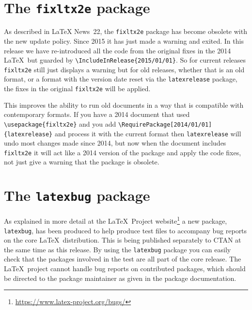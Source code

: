 \documentclass{ltnews}
\providecommand\pkg[1]{\texttt{#1}}
\begin{document}
\section{The \pkg{fixltx2e} package}
As described in \LaTeX{} News~22, the \pkg{fixltx2e} package has become
obsolete with the new update policy. Since 2015 it has just made a
warning and exited.  In this release we have re-introduced all
the code from the original fixes in the 2014 \LaTeX\ but guarded by
\verb|\IncludeInRelease{2015/01/01}|.
So for current releases \pkg{fixltx2e} still just displays a warning
but for old releases, whether that is an old format, or a format with
the version date reset via  the \pkg{latexrelease} package, the
fixes in the original \pkg{fixltx2e} will be applied.

This improves the ability to run old documents in a way that is compatible
with contemporary formats. If you have a 2014 document that used
\verb|\usepackage{fixltx2e}| and you add
\verb|\RequirePackage[2014/01/01]{latexrelease}| and process it with the
current format then \pkg{latexrelease} will undo most changes made
since 2014, but now when the document includes \pkg{fixltx2e} it
will act like a 2014 version of the package and apply the code fixes,
not just give a warning that the package is obsolete.

\section{The \pkg{latexbug} package}

As explained in more detail
at the \LaTeX\ Project
  website\footnote{\url{https://www.latex-project.org/bugs/}}
a new package, \pkg{latexbug}, has been produced to help produce
test files to accompany bug reports on the core \LaTeX\ distribution.
This is being published separately to CTAN at the same time as this
release. By using the \pkg{latexbug} package you can easily check
that the packages involved in the test are all part of the core
release. The \LaTeX\ project cannot handle bug reports on contributed
packages, which should be directed to the package maintainer as given
in the package documentation.
\end{document}
